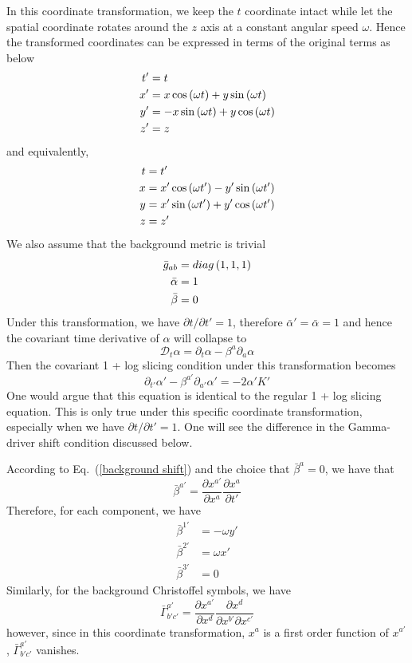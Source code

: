 \documentclass[letterpaper,nofootinbib,prd,amsmath,onecolumn]{revtex4-1}
\begin{document}
In this coordinate transformation, we keep the $t$ coordinate intact while let the spatial coordinate rotates around the $z$ axis at a constant angular speed $\omega$. Hence the transformed coordinates can be expressed in terms of the original terms as below
\begin{align}
t' & = t\notag\\
x' & = x \cos\left(\omega t\right) + y\sin\left(\omega t\right)\notag\\
y' & = -x\sin\left(\omega t\right) + y\cos\left(\omega t\right)\notag\\
z' & = z
\end{align}
and equivalently, 
\begin{align}
t & = t'\notag\\
x & = x'\cos\left(\omega t'\right) - y'\sin\left(\omega t'\right)\notag\\
y & = x'\sin\left(\omega t'\right) + y'\cos\left(\omega t'\right)\notag\\
z & = z'
\end{align}
We also assume that the background metric is trivial
\begin{align}
{\bar g}_{ab} & = diag\left(1,1,1\right)\notag\\
{\bar \alpha} & = 1\notag\\
{\bar \beta} & = 0 
\end{align}
Under this transformation, we have $\partial t/\partial t' = 1$, therefore ${\bar \alpha}' = {\bar \alpha} = 1$ and hence the covariant time derivative of $\alpha$ will collapse to
\begin{equation}
\mathscr{D}_{t}\alpha = \partial_{t}\alpha - \beta^{a}\partial_{a}\alpha
\end{equation}
Then the covariant 1 + log slicing condition under this transformation becomes
\begin{equation}\label{transformed 1 + log slicing}
\partial_{t'}\alpha' - \beta^{a'}\partial_{a'}\alpha' = -2\alpha'K'
\end{equation}
One would argue that this equation is identical to the regular 1 + log slicing equation. This is only true under this specific coordinate transformation, especially when we have $\partial t/\partial t' = 1$. One will see the difference in the Gamma-driver shift condition discussed below. 

According to Eq.~(\ref{background shift}) and the choice that ${\bar \beta}^{a} = 0$, we have that
\[
{\bar \beta}^{a'} = \frac{\partial x^{a'}}{\partial x^{a}}\frac{\partial x^{a}}{\partial t'}
\]
Therefore, for each component, we have
\begin{align*}
{\bar \beta}^{1'} & = -\omega y'\\
{\bar \beta}^{2'} & = \omega x'\\
{\bar \beta}^{3'} & = 0
\end{align*}
Similarly, for the background Christoffel symbols, we have
\[
{\bar \Gamma}^{a'}_{b'c'} = \frac{\partial x^{a'}}{\partial x^{d}}\frac{\partial x^{d}}{\partial x^{b'}\partial x^{c'}}
\]
however, since in this coordinate transformation, $x^{a}$ is a first order function of $x^{a'}$, ${\bar \Gamma}^{a'}_{b'c'}$ vanishes. 
\end{document}
